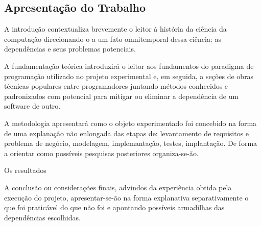 

\subsection{\textbf{Apresentação do Trabalho}}
    \label{sec:apresentacao-trabalho}
    
    A introdução contextualiza brevemente o leitor à história
    da ciência da computação direcionando-o a um fato omnitemporal
    dessa ciência: as dependências e seus problemas potenciais. 

    A fundamentação teórica introduzirá o leitor aos fundamentos do
    paradigma de programação utilizado no projeto experimental e, em seguida,
    a seções de obras técnicas populares entre programadores juntando
    métodos conhecidos e padronizados com potencial para mitigar ou
    eliminar a dependência de um software de outro.

    A metodologia apresentará como o objeto experimentado foi concebido
    na forma de uma explanação não enlongada das etapas de:
    levantamento de requisitos e problema de negócio, modelagem,
    implemantação, testes, implantação. De forma a orientar
    como possíveis pesquisas posteriores organiza-se-ão.

    Os resultados

    A conclusão ou considerações finais, advindos da experiência obtida pela execução do projeto, 
    apresentar-se-ão na forma explanativa separativamente o
    que foi praticável do que não foi e apontando possíveis armadilhas
    das dependências escolhidas.



